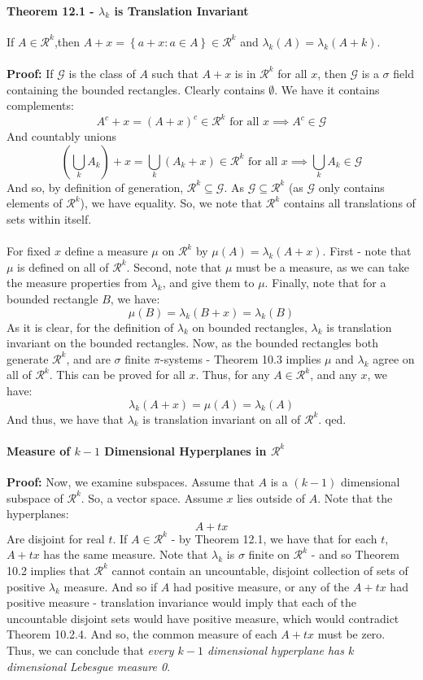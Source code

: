 \documentclass[12pt,a4paper]{article}
\newcommand{\1}[1]{\mathbbm{1}\left\{ #1 \right\}}
\newcommand{\rcal}{\mathcal{R}}
\newcommand{\gcal}{\mathcal{G}}
\begin{document}
\paragraph{Theorem 12.1 - $\lambda_k$ is Translation Invariant} If $A \in \rcal^k$,then $A + x = \left\{a + x : a \in A\right\} \in \rcal^k$ and $\lambda_k(A) = \lambda_k(A + k)$.
\\\\
\textbf{Proof:} If $\gcal$ is the class of $A$ such that $A + x$ is in $\rcal^k$ for all $x$, then $\gcal$ is a $\sigma$ field containing the bounded rectangles. Clearly contains $\emptyset$. We have it contains complements:
$$
	A^c + x = (A + x)^c \in \rcal^k \text{ for all $x$} \implies
	A^c \in \gcal
$$
And countably unions
$$
	(\bigcup_k A_k) + x = \bigcup_k (A_k + x) \in \rcal^k \text{ for all $x$} \implies \bigcup_k A_k \in \gcal
$$
And so, by definition of generation, $\rcal^k \subseteq \gcal$. As $\gcal \subseteq \rcal^k$ (as $\gcal$ only contains elements of $\rcal^k$), we have equality. So, we note that $\rcal^k$ contains all translations of sets within itself.
\\\\
For fixed $x$ define a measure $\mu$ on $\rcal^k$ by $\mu(A) = \lambda_k(A + x)$. First - note that $\mu$ is defined on all of $\rcal^k$. Second, note that $\mu$ must be a measure, as we can take the measure properties from $\lambda_k$, and give them to $\mu$. Finally, note that for a bounded rectangle $B$, we have:
$$
	\mu(B) = \lambda_k(B + x) = \lambda_k(B)
$$
As it is clear, for the definition of $\lambda_k$ on bounded rectangles, $\lambda_k$ is translation invariant on the bounded rectangles. Now, as the bounded rectangles both generate $\rcal^k$, and are $\sigma$ finite $\pi$-systems - Theorem 10.3 implies $\mu$ and $\lambda_k$ agree on all of $\rcal^k$. This can be proved for all $x$. Thus, for any $A \in \rcal^k$, and any $x$, we have:
$$
	\lambda_k(A + x) = \mu(A) = \lambda_k(A)
$$
And thus, we have that $\lambda_k$ is translation invariant on all of $\rcal^k$. qed.

\paragraph{Measure of $k - 1$ Dimensional Hyperplanes in $\rcal^k$} \textbf{Proof:} 
Now, we examine subspaces. Assume that $A$ is a $(k-1)$ dimensional subspace of $\rcal^k$. So, a vector space. Assume $x$ lies outside of $A$. Note that the hyperplanes:
$$
	A + tx
$$
Are disjoint for real $t$. If $A \in \rcal^k$ - by Theorem 12.1, we have that for each $t$, $A + tx$ has the same measure. Note that $\lambda_k$ is $\sigma$ finite on $\rcal^k$ - and so Theorem 10.2 implies that $\rcal^k$ cannot contain an uncountable, disjoint collection of sets of positive $\lambda_k$ measure. And so if $A$ had positive measure, or any of the $A + tx$ had positive measure - translation invariance would imply that each of the uncountable disjoint sets would have positive measure, which would contradict Theorem 10.2.4. And so, the common measure of each $A + tx$ must be zero. Thus, we can conclude that \textit{every $k-1$ dimensional hyperplane has $k$ dimensional Lebesgue measure 0}.
\end{document}
